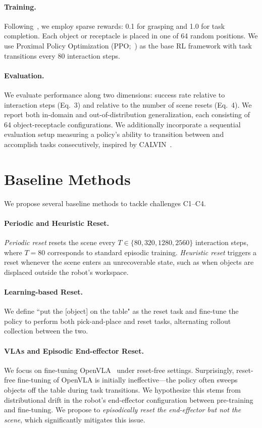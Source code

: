 \paragraph{Training.}
Following~\cite{liu2025rlvla}, we employ sparse rewards: 0.1 for grasping and 1.0 for task completion. Each object or receptacle is placed in one of 64 random positions. We use Proximal Policy Optimization (PPO;~\cite{schulman2017ppo}) as the base RL framework with task transitions every 80 interaction steps.

\paragraph{Evaluation.}
We evaluate performance along two dimensions: success rate relative to interaction steps (Eq.~3) and relative to the number of scene resets (Eq.~4). We report both in-domain and out-of-distribution generalization, each consisting of 64 object-receptacle configurations. We additionally incorporate a sequential evaluation setup measuring a policy's ability to transition between and accomplish tasks consecutively, inspired by CALVIN~\cite{mees2022calvin}.

\section{Baseline Methods}

We propose several baseline methods to tackle challenges C1--C4.

\paragraph{Periodic and Heuristic Reset.}
\emph{Periodic reset} resets the scene every $T \in \{80, 320, 1280, 2560\}$ interaction steps, where $T=80$ corresponds to standard episodic training. \emph{Heuristic reset} triggers a reset whenever the scene enters an unrecoverable state, such as when objects are displaced outside the robot's workspace.

\paragraph{Learning-based Reset.}
We define ``put the [object] on the table" as the reset task and fine-tune the policy to perform both pick-and-place and reset tasks, alternating rollout collection between the two.

\paragraph{VLAs and Episodic End-effector Reset.}
We focus on fine-tuning OpenVLA~\cite{kim2024openvla} under reset-free settings. Surprisingly, reset-free fine-tuning of OpenVLA is initially ineffective—the policy often sweeps objects off the table during task transitions. We hypothesize this stems from distributional drift in the robot's end-effector configuration between pre-training and fine-tuning. We propose to \emph{episodically reset the end-effector but not the scene}, which significantly mitigates this issue.

